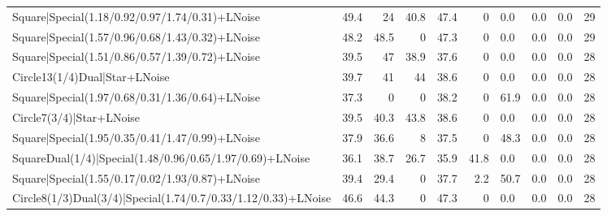 \begin{tabular}{lrrrrrlllr}
 Square|Special(1.18/0.92/0.97/1.74/0.31)+LNoise                 &            49.4 &            24   &            40.8 &            47.4 &            0   & 0.0             & 0.0            & 0.0            &           29 \\
 Square|Special(1.57/0.96/0.68/1.43/0.32)+LNoise                 &            48.2 &            48.5 &             0   &            47.3 &            0   & 0.0             & 0.0            & 0.0            &           29 \\
 Square|Special(1.51/0.86/0.57/1.39/0.72)+LNoise                 &            39.5 &            47   &            38.9 &            37.6 &            0   & 0.0             & 0.0            & 0.0            &           28 \\
 Circle13(1/4)Dual|Star+LNoise                                   &            39.7 &            41   &            44   &            38.6 &            0   & 0.0             & 0.0            & 0.0            &           28 \\
 Square|Special(1.97/0.68/0.31/1.36/0.64)+LNoise                 &            37.3 &             0   &             0   &            38.2 &            0   & 61.9            & 0.0            & 0.0            &           28 \\
 Circle7(3/4)|Star+LNoise                                        &            39.5 &            40.3 &            43.8 &            38.6 &            0   & 0.0             & 0.0            & 0.0            &           28 \\
 Square|Special(1.95/0.35/0.41/1.47/0.99)+LNoise                 &            37.9 &            36.6 &             8   &            37.5 &            0   & 48.3            & 0.0            & 0.0            &           28 \\
 SquareDual(1/4)|Special(1.48/0.96/0.65/1.97/0.69)+LNoise        &            36.1 &            38.7 &            26.7 &            35.9 &           41.8 & 0.0             & 0.0            & 0.0            &           28 \\
 Square|Special(1.55/0.17/0.02/1.93/0.87)+LNoise                 &            39.4 &            29.4 &             0   &            37.7 &            2.2 & 50.7            & 0.0            & 0.0            &           28 \\
 Circle8(1/3)Dual(3/4)|Special(1.74/0.7/0.33/1.12/0.33)+LNoise   &            46.6 &            44.3 &             0   &            47.3 &            0   & 0.0             & 0.0            & 0.0            &           28 \\

\end{tabular}
